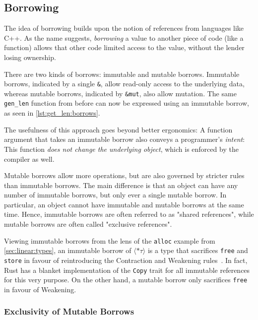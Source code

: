 \documentclass[sigplan,11pt,screen,nonacm]{acmart}
\newcommand*{\Copy}{\texttt{Copy}}
\begin{document}
\subsection{Borrowing} \label{sec:rust:borrowing}

The idea of borrowing builds upon the notion of references from languages like C++. As the name suggests, \emph{borrowing} a value to another piece of code (like a function) allows that other code limited access to the value, without the lender losing ownership.

There are two kinds of borrows: immutable and mutable borrows. Immutable borrows, indicated by a single \texttt{&}, allow read-only access to the underlying data, whereas mutable borrows, indicated by \texttt{&mut}, also allow mutation. The same \texttt{gen_len} function from before can now be expressed using an immutable borrow, as seen in \cref{lst:get_len:borrows}.

The usefulness of this approach goes beyond better ergonomics: A function argument that takes an immutable borrow also conveys a programmer's \emph{intent}: This function \emph{does not change the underlying object}, which is enforced by the compiler as well.

Mutable borrows allow more operations, but are also governed by stricter rules than immutable borrows. The main difference is that an object can have any number of immutable borrows, but only ever a single mutable borrow. In particular, an object cannot have immutable and mutable borrows at the same time. Hence, immutable borrows are often referred to as "shared references", while mutable borrows are often called "exclusive references".

Viewing immutable borrows from the lens of the \texttt{alloc} example from \cref{sec:linear:types}, an immutable borrow of \(\langle *\tau\rangle\) is a type that sacrifices \texttt{free} and \texttt{store} in favour of reintroducing the Contraction and Weakening rules~\cite{from-linearity-to-borrowing}. In fact, Rust has a blanket implementation of the \Copy{} trait for all immutable references~\cite{rust:marker-copy} for this very purpose. On the other hand, a mutable borrow only sacrifices \texttt{free} in favour of Weakening.

\subsubsection{Exclusivity of Mutable Borrows}
\end{document}
